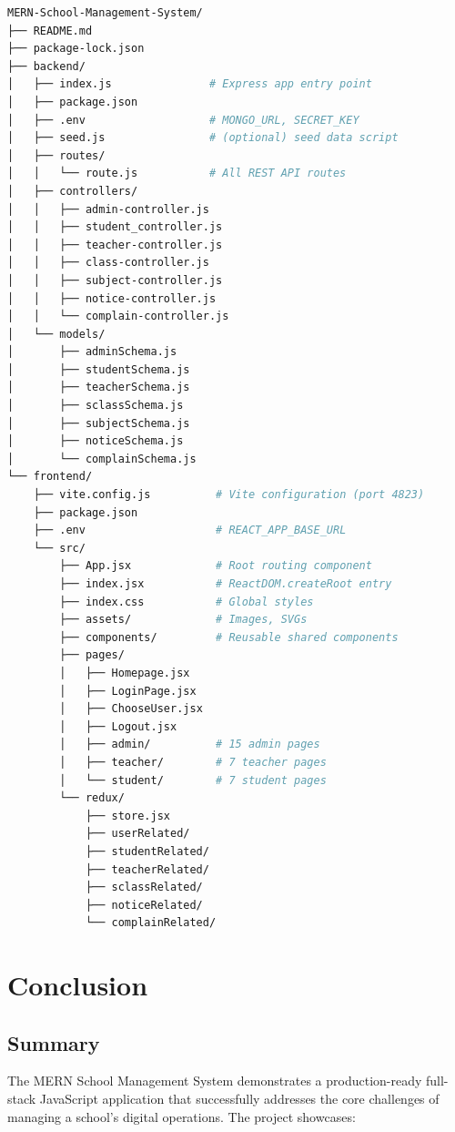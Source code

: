 \documentclass[12pt,a4paper]{report}
\begin{document}
\begin{lstlisting}[language=bash, caption=Full project structure]
MERN-School-Management-System/
├── README.md
├── package-lock.json
├── backend/
│   ├── index.js               # Express app entry point
│   ├── package.json
│   ├── .env                   # MONGO_URL, SECRET_KEY
│   ├── seed.js                # (optional) seed data script
│   ├── routes/
│   │   └── route.js           # All REST API routes
│   ├── controllers/
│   │   ├── admin-controller.js
│   │   ├── student_controller.js
│   │   ├── teacher-controller.js
│   │   ├── class-controller.js
│   │   ├── subject-controller.js
│   │   ├── notice-controller.js
│   │   └── complain-controller.js
│   └── models/
│       ├── adminSchema.js
│       ├── studentSchema.js
│       ├── teacherSchema.js
│       ├── sclassSchema.js
│       ├── subjectSchema.js
│       ├── noticeSchema.js
│       └── complainSchema.js
└── frontend/
    ├── vite.config.js          # Vite configuration (port 4823)
    ├── package.json
    ├── .env                    # REACT_APP_BASE_URL
    └── src/
        ├── App.jsx             # Root routing component
        ├── index.jsx           # ReactDOM.createRoot entry
        ├── index.css           # Global styles
        ├── assets/             # Images, SVGs
        ├── components/         # Reusable shared components
        ├── pages/
        │   ├── Homepage.jsx
        │   ├── LoginPage.jsx
        │   ├── ChooseUser.jsx
        │   ├── Logout.jsx
        │   ├── admin/          # 15 admin pages
        │   ├── teacher/        # 7 teacher pages
        │   └── student/        # 7 student pages
        └── redux/
            ├── store.jsx
            ├── userRelated/
            ├── studentRelated/
            ├── teacherRelated/
            ├── sclassRelated/
            ├── noticeRelated/
            └── complainRelated/
\end{lstlisting}

\chapter{Conclusion}

\section{Summary}

The MERN School Management System demonstrates a production-ready full-stack JavaScript application that successfully addresses the core challenges of managing a school's digital operations. The project showcases:
\end{document}
